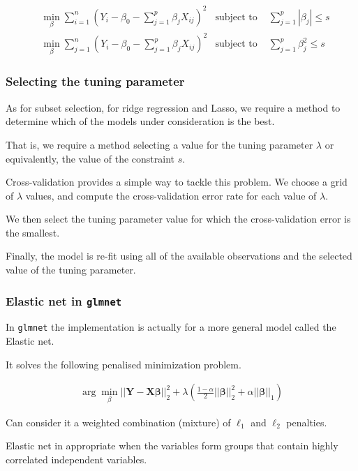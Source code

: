 \begin{align*}
    & \min_\beta \sum_{i=1}^n(Y_i - \beta_0-\sum_{j=1}^p \beta_jX_{ij})^2 & \text{subject to } & \sum_{j=1}^p|\beta_j|\leq s\\
    & \min_\beta \sum_{j=1}^n(Y_i - \beta_0 - \sum_{j=1}^p\beta_jX_{ij})^2 & \text {subject to } & \sum_{j=1}^p\beta_j^2\leq s
\end{align*}

\subsubsection{Selecting the tuning parameter}

\indent 

As for subset selection, for ridge regression and Lasso, we require a method to determine which of the models under consideration is the best.

That is, we require a method selecting a value for the tuning parameter $\lambda$ or equivalently, the value of the constraint $s$.

Cross-validation provides a simple way to tackle this problem. We choose a grid of $\lambda$ values, and compute the cross-validation error rate for each value of $\lambda$.

We then select the tuning parameter value for which the cross-validation error is the smallest.

Finally, the model is re-fit using all of the available observations and the selected value of the tuning parameter.

\subsubsection{Elastic net in \texttt{glmnet}}

\indent 

In \texttt{glmnet} the implementation is actually for a more general model called the Elastic net.

It solves the following penalised minimization problem.

\begin{align*}
    \arg \min_\beta ||\boldsymbol{Y}-\boldsymbol{X\beta}||_2^2 + \lambda(\frac{1-\alpha}{2}||\boldsymbol{\beta}||_2^2 + \alpha||\boldsymbol{\beta}||_1)
\end{align*}

Can consider it a weighted combination (mixture) of $\ell_1$ and $\ell_2$ penalties.

Elastic net in appropriate when the variables form groups that contain highly correlated independent variables.